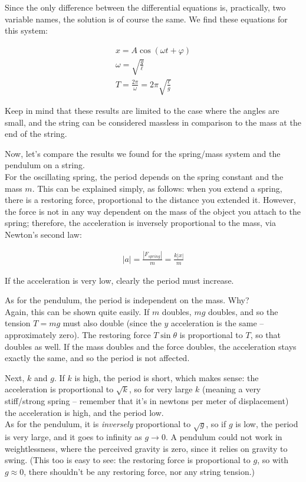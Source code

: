 Since the only difference between the differential equations is, practically, two variable names, the solution is of course the same. We find these equations for this system:

\begin{align}
x = A \cos(\omega t + \varphi)\\
\omega = \sqrt{\frac{g}{\ell}}\\
T = \frac{2 \pi}{\omega} = 2 \pi \sqrt{\frac{\ell}{g}}
\end{align}

Keep in mind that these results are limited to the case where the angles are small, and the string can be considered massless in comparison to the mass at the end of the string.

Now, let's compare the results we found for the spring/mass system and the pendulum on a string.\\
For the oscillating spring, the period depends on the spring constant and the mass $m$. This can be explained simply, as follows: when you extend a spring, there is a restoring force, proportional to the distance you extended it. However, the force is not in any way dependent on the mass of the object you attach to the spring; therefore, the acceleration is inversely proportional to the mass, via Newton's second law:

\begin{align}
|a| = \frac{|F_{spring}|}{m} = \frac{k |x|}{m}
\end{align}

If the acceleration is very low, clearly the period must increase.

As for the pendulum, the period is independent on the mass. Why?\\
Again, this can be shown quite easily. If $m$ doubles, $m g$ doubles, and so the tension $T = m g$ must also double (since the $y$ acceleration is the same -- approximately zero). The restoring force $T \sin \theta$ is proportional to $T$, so that doubles as well. If the mass doubles and the force doubles, the acceleration stays exactly the same, and so the period is not affected.

Next, $k$ and $g$. If $k$ is high, the period is short, which makes sense: the acceleration is proportional to $\sqrt{k}$, so for very large $k$ (meaning a very stiff/strong spring -- remember that it's in newtons per meter of displacement) the acceleration is high, and the period low.\\
As for the pendulum, it is \emph{inversely} proportional to $\sqrt{g}$, so if $g$ is low, the period is very large, and it goes to infinity as $g \to 0$. A pendulum could not work in weightlessness, where the perceived gravity is zero, since it relies on gravity to swing. (This too is easy to see: the restoring force is proportional to $g$, so with $g \approx 0$, there shouldn't be any restoring force, nor any string tension.)


